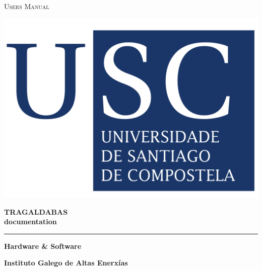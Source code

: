 \documentclass[a4paper]{book}
\begin{document}
\begin{titlepage}
	\par
	\centering
	\vspace{1cm}
	
\begin{minipage}[b]{0.5\linewidth}
\centering
	{\scshape\LARGE Users Manual}
	\vspace{40pt}
\end{minipage}
\begin{minipage}[b]{0.4\linewidth}
\includegraphics[height=8\baselineskip]{LogoUSC}
\end{minipage}

	\vspace{1.5cm}
	{\huge\bfseries TRAGALDABAS\\documentation\par}
	\vspace{0.25cm}
	
	\noindent\rule{\textwidth}{1pt}
	
	\vspace{0.25cm}
	{\huge\bfseries Hardware \& Software\par}
	
	\vspace{2cm}
	
	{\large\bfseries Instituto Galego de Altas Enerxías\par}
	\vspace{1cm}

%
%


\end{titlepage}
\end{document}
